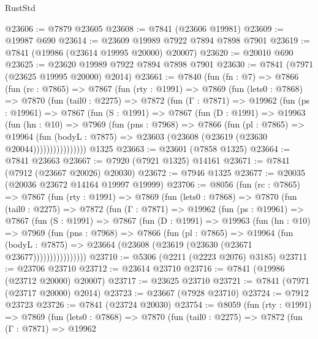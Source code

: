 \begin{lexlean}{RustStd}
\begin{coremodule}
@23606 := @7879 @23605
@23608 := @7841 (@23606 @19981)
@23609 := @19987 @690
@23614 := @23609 @19989 @7922 @7894 @7898 @7901
@23619 := @7841 (@19986 (@23614 @19995 @20000) @20007)
@23620 := @20010 @690
@23625 := @23620 @19989 @7922 @7894 @7898 @7901
@23630 := @7841 (@7971 (@23625 @19995 @20000) @2014)
@23661 := @7840
    (fun (fn : @7) =>
    @7866
      (fun (rc : @7865) =>
      @7867
        (fun (rty : @1991) =>
        @7869
          (fun (lets0 : @7868) =>
          @7870
            (fun (tail0 : @2275) =>
            @7872
              (fun (Γ : @7871) =>
              @19962
                (fun (ps : @19961) =>
                @7867
                  (fun (S : @1991) =>
                  @7867
                    (fun (D : @1991) =>
                    @19963
                      (fun (hn : @10) =>
                      @7969
                        (fun (pns : @7968) =>
                        @7866
                          (fun (pl : @7865) =>
                          @19964
                            (fun (bodyL : @7875) =>
                            @23603 (@23608 (@23619 (@23630 @20044))))))))))))))))
    @1325
@23663 := @23601 (@7858 @1325)
@23664 := @7841 @23663
@23667 := @7920 (@7921 @1325) @14161
@23671 := @7841 (@7912 (@23667 @20026) @20030)
@23672 := @7946 @1325
@23677 := @20035 (@20036 @23672 @14164 @19997 @19999)
@23706 := @8056
    (fun (rc : @7865) =>
    @7867
      (fun (rty : @1991) =>
      @7869
        (fun (lets0 : @7868) =>
        @7870
          (fun (tail0 : @2275) =>
          @7872
            (fun (Γ : @7871) =>
            @19962
              (fun (ps : @19961) =>
              @7867
                (fun (S : @1991) =>
                @7867
                  (fun (D : @1991) =>
                  @19963
                    (fun (hn : @10) =>
                    @7969
                      (fun (pns : @7968) =>
                      @7866
                        (fun (pl : @7865) =>
                        @19964
                          (fun (bodyL : @7875) =>
                          @23664 (@23608 (@23619 (@23630 (@23671 @23677))))))))))))))))
@23710 := @5306 (@2211 (@2223 @2076) @3185)
@23711 := @23706 @23710
@23712 := @23614 @23710
@23716 := @7841 (@19986 (@23712 @20000) @20007)
@23717 := @23625 @23710
@23721 := @7841 (@7971 (@23717 @20000) @2014)
@23723 := @23667 (@7928 @23710)
@23724 := @7912 @23723
@23726 := @7841 (@23724 @20030)
@23754 := @8059
    (fun (rty : @1991) =>
    @7869
      (fun (lets0 : @7868) =>
      @7870
        (fun (tail0 : @2275) =>
        @7872
          (fun (Γ : @7871) =>
          @19962

\end{coremodule}
\end{lexlean}
